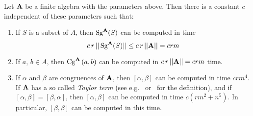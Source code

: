\begin{prop}\label{speedprop}
Let $\alg A$ be a finite algebra with the parameters above. Then
there is a constant $c$ independent of these parameters
such that:
\begin{enumerate}
\item \label{speed1} If $S$ is a subset of $A$,
then $\Sg^{\alg A}(S)$ can be computed
in time
\[
c\, r\,||\Sg^{\alg A}(S)|| \le c\, r\,||\alg A|| = crm
\]
\item \label{speed2} If $a$, $b \in A$, then $\Cga a b A$ can be
computed in
$c\, r\, ||\alg A|| = crm$ time.
\item \label{speed3}
If $\alpha$ and $\beta$ are congruences of $\alg A$,
then $[\alpha,\beta]$ can be computed in time $crm^4$.
If $\alg A$ has a so called \emph{Taylor term}
(see e.g.~\cite{MR3076179} or~\cite{HM:1988} for the definition),
and if $[\alpha,\beta] = [\beta,\alpha]$,
then $[\alpha,\beta]$ can be computed in time $c(rm^2 + n^5)$.
In particular, $[\beta,\beta]$ can be computed in this time.
\end{enumerate}
\end{prop}

